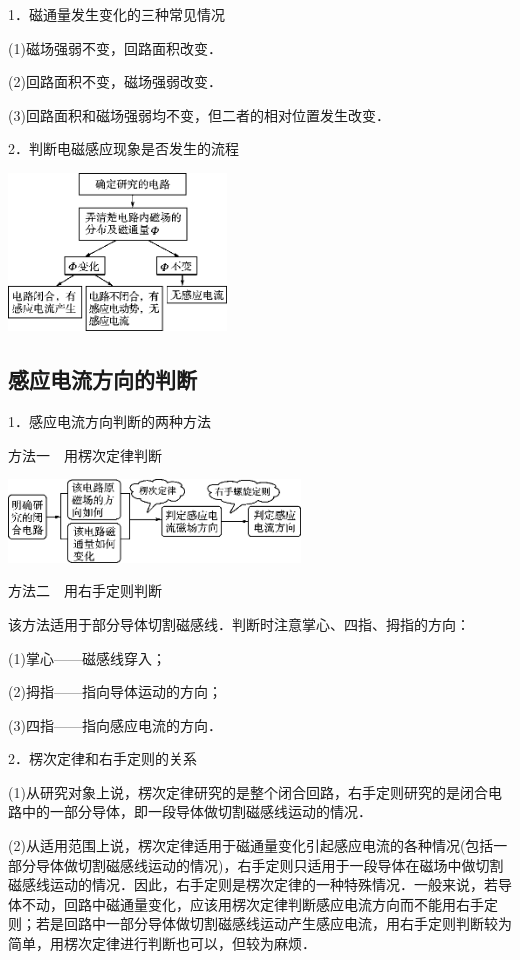1．磁通量发生变化的三种常见情况

(1)磁场强弱不变，回路面积改变．

(2)回路面积不变，磁场强弱改变．

(3)回路面积和磁场强弱均不变，但二者的相对位置发生改变．

2．判断电磁感应现象是否发生的流程

\begin{center}\includegraphics[width=2.28333in,height=1.65069in]{media/image387.png}\end{center}

\newpage
\subsection{感应电流方向的判断}

1．感应电流方向判断的两种方法

方法一　用楞次定律判断

\begin{center}\includegraphics[width=3.05694in,height=0.86806in]{media/image389.png}\end{center}

方法二　用右手定则判断

该方法适用于部分导体切割磁感线．判断时注意掌心、四指、拇指的方向：

(1)掌心------磁感线穿入；

(2)拇指------指向导体运动的方向；

(3)四指------指向感应电流的方向．

2．楞次定律和右手定则的关系

(1)从研究对象上说，楞次定律研究的是整个闭合回路，右手定则研究的是闭合电路中的一部分导体，即一段导体做切割磁感线运动的情况．

(2)从适用范围上说，楞次定律适用于磁通量变化引起感应电流的各种情况(包括一部分导体做切割磁感线运动的情况)，右手定则只适用于一段导体在磁场中做切割磁感线运动的情况．因此，右手定则是楞次定律的一种特殊情况．一般来说，若导体不动，回路中磁通量变化，应该用楞次定律判断感应电流方向而不能用右手定则；若是回路中一部分导体做切割磁感线运动产生感应电流，用右手定则判断较为简单，用楞次定律进行判断也可以，但较为麻烦．

